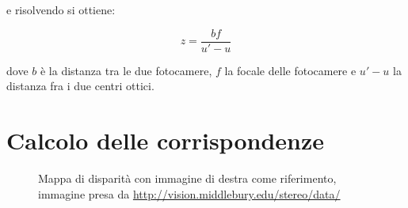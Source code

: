 \documentclass[12pt]{report}
\begin{document}
			\noindent e risolvendo si ottiene:

			\begin{equation}
				z=\frac{bf}{u'-u}
				\label{eq:soluzione}
			\end{equation}
			
			\noindent dove $b$ è la distanza tra le due fotocamere, $f$ la focale delle fotocamere e $u'-u$ la distanza fra i due centri ottici.
		
		
		\section{Calcolo delle corrispondenze}
		\label{sec:corrispondenze}
		
			\begin{figure}
				 \quad
				 \quad
				\caption{Mappa di disparità con immagine di destra come riferimento, immagine presa da \url{http://vision.middlebury.edu/stereo/data/}}
				\label{fig:disparità}
			\end{figure}
			
			
			
\end{document}
